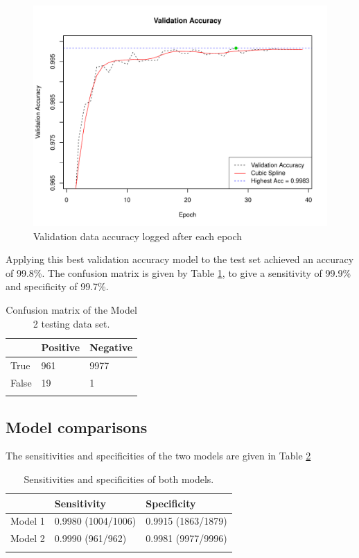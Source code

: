 \begin{figure}[ht]
	\centering
	\includegraphics[width=\textwidth]{Images/7_valid_acc5.pdf}
	\caption{Validation data accuracy logged after each epoch}
	\label{results-valid-acc5-fig}
\end{figure}

Applying this best validation accuracy model to the test set achieved an accuracy of 99.8\%. The confusion matrix is given by Table \ref{results-confmat5-tab}, to give a sensitivity of 99.9\% and specificity of 99.7\%.

\begin{table}[ht]
	\centering
	\begin{tabular}{@{}lll@{}}
	\toprule[1.5pt]
	& Positive & Negative\\
	\midrule
	True & 961 & 9977\\
	False & 19 & 1\\
	\bottomrule[1.5pt]\\
	\end{tabular}
	\caption{Confusion matrix of the Model 2 testing data set.}
	\label{results-confmat5-tab}
\end{table}

\subsection*{Model comparisons}

The sensitivities and specificities of the two models are given in Table \ref{results-sens-spec-tab}
\begin{table}[ht]
	\centering
	\begin{tabular}{@{}lll@{}}
	\toprule[1.5pt]
	& Sensitivity & Specificity\\
	\midrule
	Model 1 & 0.9980 (1004/1006) & 0.9915 (1863/1879)\\
	Model 2 & 0.9990 (961/962) & 0.9981 (9977/9996)\\
	\bottomrule[1.5pt]\\
	\end{tabular}
	\caption{Sensitivities and specificities of both models.}
	\label{results-sens-spec-tab}
\end{table}


